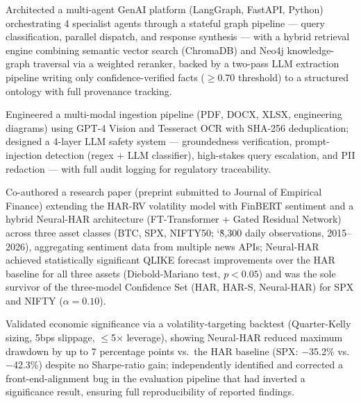 \begin{resumeList}
    \item Architected a multi-agent GenAI platform (LangGraph, FastAPI, Python) orchestrating 4 specialist agents through a stateful graph pipeline --- query classification, parallel dispatch, and response synthesis --- with a hybrid retrieval engine combining semantic vector search (ChromaDB) and Neo4j knowledge-graph traversal via a weighted reranker, backed by a two-pass LLM extraction pipeline writing only confidence-verified facts ($\geq$0.70 threshold) to a structured ontology with full provenance tracking.
    \item Engineered a multi-modal ingestion pipeline (PDF, DOCX, XLSX, engineering diagrams) using GPT-4 Vision and Tesseract OCR with SHA-256 deduplication; designed a 4-layer LLM safety system --- groundedness verification, prompt-injection detection (regex + LLM classifier), high-stakes query escalation, and PII redaction --- with full audit logging for regulatory traceability.
\end{resumeList}

\begin{resumeList}
    \item Co-authored a research paper (preprint submitted to Journal of Empirical Finance) extending the HAR-RV volatility model with FinBERT sentiment and a hybrid Neural-HAR architecture (FT-Transformer + Gated Residual Network) across three asset classes (BTC, SPX, NIFTY50; \char`\~8,300 daily observations, 2015--2026), aggregating sentiment data from multiple news APIs; Neural-HAR achieved statistically significant QLIKE forecast improvements over the HAR baseline for all three assets (Diebold-Mariano test, $p < 0.05$) and was the sole survivor of the three-model Confidence Set (HAR, HAR-S, Neural-HAR) for SPX and NIFTY ($\alpha = 0.10$).
    \item Validated economic significance via a volatility-targeting backtest (Quarter-Kelly sizing, 5bps slippage, $\leq$5$\times$ leverage), showing Neural-HAR reduced maximum drawdown by up to 7 percentage points vs.\ the HAR baseline (SPX: $-$35.2\% vs.\ $-$42.3\%) despite no Sharpe-ratio gain; independently identified and corrected a front-end-alignment bug in the evaluation pipeline that had inverted a significance result, ensuring full reproducibility of reported findings.
\end{resumeList}

